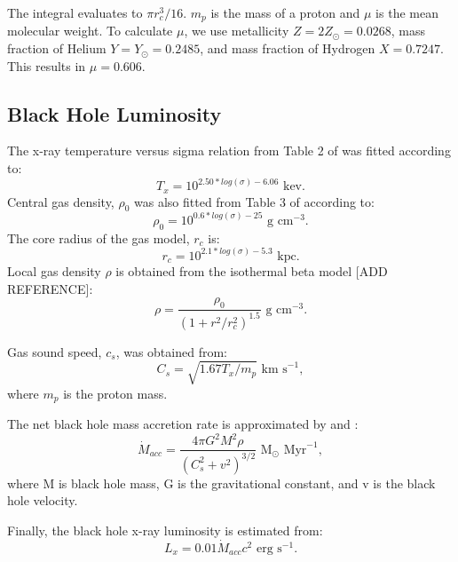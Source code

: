 \documentclass[english, backref,breaklinks,colorlinks,citecolor=blue, usenatbib]{mnras}
\begin{document}
The integral evaluates to ${\pi}r_c^3/16$.  $m_p$ is the mass of a proton and $\mu$ is the mean molecular weight.  To calculate $\mu$, we use metallicity $Z=2Z_{\odot}=0.0268$, mass fraction of Helium $Y=Y_{\odot}=0.2485$, and mass fraction of Hydrogen $X=0.7247$.  This results in $\mu=0.606$.

\subsection{Black Hole Luminosity}
The x-ray temperature versus sigma relation from Table 2 of  \citet{2018ApJ...857...32B} was fitted according to:
\begin{equation}
    T_x = 10^{2.50*log(\sigma) - 6.06} \text{  kev}.
\end{equation}
Central gas density, ${\rho}_0$ was also fitted from Table 3 of \citet{2018ApJ...857...32B} according to:
\begin{equation}
    \rho_0 = 10^{0.6*log(\sigma) - 25} \text{  g cm}^{-3}.
\end{equation}
The core radius of the gas model, ${r_c}$ is:
\begin{equation}
    r_c = 10^{2.1*log(\sigma) - 5.3} \text{  kpc}.
\end{equation}
Local gas density ${\rho}$ is obtained from the isothermal beta model [ADD REFERENCE]:
\begin{equation} \label{beta_model}
    \rho = \frac{\rho_0}{(1+r^2/r_c^2)^{1.5}} \text{  g cm}^{-3}.
\end{equation}

Gas sound speed, $c_s$, was obtained from:
\begin{equation}
    C_s = \sqrt{1.67T_x/m_p} \text{  km s}^{-1},
\end{equation}
where $m_p$ is the proton mass.

The net black hole mass accretion rate is approximated by \citet{2018MNRAS.476.1412I} and \citet{2019arXiv190202349I}:
\begin{equation}
    \dot{M}_{acc} = \frac{4{\pi}G^2M^2\rho}{(C_s^2+v^2)^{3/2}} \text{  M}_\odot \text{ Myr}^{-1},
\end{equation}
where M is black hole mass, G is the gravitational constant, and v is the black hole velocity.

Finally, the black hole x-ray luminosity is estimated from:
\begin{equation}
    L_x = 0.01\dot{M}_{acc}c^2 \text{  erg s}^{-1}.
\end{equation}
\end{document}
